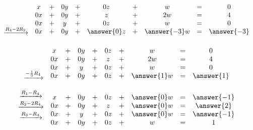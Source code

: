 \documentclass{ximera}
\begin{document}
\begin{exploration}
$$\begin{array}{c}
\\
\\
 \\
\xrightarrow{R_4-2R_2}\\
 \end{array}
\begin{array}{ccccccccc}
      x &+ &0y&+&0z&+&w&= &0 \\
	 0x& +&0y&+&z&+&2w&=&4\\
     0x& +&y&+&0z&+&w&=&0\\
     0x&+&0y&+&\answer{0}z&+&\answer{-3}w&=&\answer{-3}
    \end{array}$$


$$\begin{array}{c}
\\
 \\
 \\
\xrightarrow{-\frac{1}{3}R_4}\\
 \end{array}
\begin{array}{ccccccccc}
      x &+ &0y&+&0z&+&w&= &0 \\
	 0x& +&0y&+&z&+&2w&=&4\\
     0x& +&y&+&0z&+&w&=&0\\
     0x&+&0y&+&0z&+&\answer{1}w&=&\answer{1}
    \end{array}$$
    

$$
\begin{array}{c}
 \xrightarrow{R_1-R_4}\\
 \xrightarrow{R_2-2R_4}\\
\xrightarrow{R_3-R_4}\\
\\
 \end{array}
\begin{array}{ccccccccc}
      x &+ &0y&+&0z&+&\answer{0}w&= &\answer{-1} \\
	 0x& +&0y&+&z&+&\answer{0}w&=&\answer{2}\\
     0x& +&y&+&0z&+&\answer{0}w&=&\answer{-1}\\
     0x&+&0y&+&0z&+&w&=&1
    \end{array}$$
    


\end{exploration}
\end{document}
